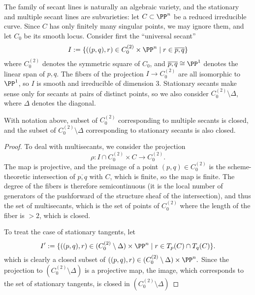 The family of secant lines is naturally an algebraic variety, and the stationary and multiple secant lines are subvarieties: let $C\subset \PP^n$ be a reduced irreducible curve. Since $C$ has only finitely many singular points, we may ignore them, and let $C_0$ be its smooth locus. Consider first the ``universal secant''
$$
I := \{((p,q), r)\in C_0^{(2)}\times \PP^n \mid r\in \overline{p,q}\}
$$
where $C_0^{(2)}$ denotes the symmetric square of $C_0$, and $\overline{p,q}\cong \PP^1$ denotes the linear span of $p,q$.
The fibers of the projection $I \to C_0^{(2)}$ are all isomorphic to $\PP^1$,
so $I$ is smooth and irreducible of dimension 3. Stationary secants
make sense only for secants at pairs of distinct points, so we 
also consider $C_0^{(2)}\setminus \Delta$, where $\Delta$ denotes the diagonal.

\begin{proposition}
With notation above, subset of $C_0^{(2)}$ corresponding to 
multiple secants  is closed, and the subset of 
$C_0^{(2)}\setminus \Delta$ corresponding to stationary secants is also closed. 
\end{proposition}

\begin{proof}
To deal with multisecants, we consider the projection 
$$
\rho: I\cap C_0^{(2)}\times C \to C_0^{(2)}.
$$
The map is projective, and the preimage of a point $(p,q)\in C_0^{(2)}$ is the scheme-theoretic intersection of $\overline{p,q}$ with
$C$, which is finite, so the map is finite. The degree of the fibers is therefore semicontinuous (it is the local number of generators of the pushforward of
the structure sheaf of the intersection), and thus the set of multisecants, which is the set of points of $C_0^{(2)}$ where the length of the 
fiber is $>2$, which is closed.

To treat the case of stationary tangents, let  
$$
I' := \{((p,q), r)\in (C_0^{(2)}\setminus \Delta)\times \PP^n \mid r \in T_p(C) \cap T_q(C)\}.
$$
which is clearly a closed subset of $((p,q), r)\in (C_0^{(2)}\setminus \Delta)\times \PP^n.$
Since the projection to $(C_0^{(2)}\setminus \Delta)$ is a projective map,
the image, which corresponds to the set of stationary tangents, is closed
in $(C_0^{(2)}\setminus \Delta)$
\end{proof}

